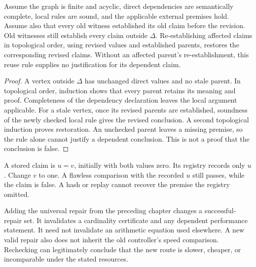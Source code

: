 \begin{Coretheorem}\label{Core:r:dependencies}
Assume the graph is finite and acyclic, direct dependencies are semantically complete, local rules are sound, and the applicable external premises hold. Assume also that every old witness established its old claim before the revision. Old witnesses still establish every claim outside $\Delta$. Re-establishing affected claims in topological order, using revised values and established parents, restores the corresponding revised claims. Without an affected parent's re-establishment, this reuse rule supplies no justification for its dependent claim.
\end{Coretheorem}
\begin{proof}
A vertex outside $\Delta$ has unchanged direct values and no stale parent. In topological order, induction shows that every parent retains its meaning and proof. Completeness of the dependency declaration leaves the local argument applicable. For a stale vertex, once its revised parents are established, soundness of the newly checked local rule gives the revised conclusion. A second topological induction proves restoration. An unchecked parent leaves a missing premise, so the rule alone cannot justify a dependent conclusion. This is not a proof that the conclusion is false.
\end{proof}

\begin{Corecounterexample}\label{Core:ce:dependency}
A stored claim is $u=v$, initially with both values zero. Its registry records only $u$. Change $v$ to one. A flawless comparison with the recorded $u$ still passes, while the claim is false. A hash or replay cannot recover the premise the registry omitted.
\end{Corecounterexample}

Adding the universal repair from the preceding chapter changes a successful-repair set. It invalidates a cardinality certificate and any dependent performance statement. It need not invalidate an arithmetic equation used elsewhere. A new valid repair also does not inherit the old controller's speed comparison. Rechecking can legitimately conclude that the new route is slower, cheaper, or incomparable under the stated resources.


